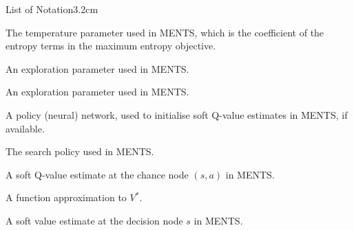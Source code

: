 \begin{mclistof}{List of Notation}{3.2cm}
    \item[{\parbox[t]{\textwidth}{
        \Large\textbf{Maximum ENtropy Tree Search (Section \ref{sec:2-4-3-ments})}\hfill\hfill
    }}]
    \item[TODO]
    \item[$\alpha_{\ments}$] 
        The temperature parameter used in MENTS, which is the coefficient of the entropy terms in the maximum entropy objective.
    \item[$\epsilon$]
        An exploration parameter used in MENTS.
    \item[$\lambda_s$] 
        An exploration parameter used in MENTS.
    \item[$\tilde{\pi}$] 
        A policy (neural) network, used to initialise soft Q-value estimates in MENTS, if available. 
    \item[$\piments$] 
        The search policy used in MENTS.
    \item[$\Qments(s,a)$] 
        A soft Q-value estimate at the chance node $(s,a)$ in MENTS.
    \item[$\tilde{V}$] 
        A function approximation to $V^*$.
    \item[$\Vments(s)$] 
        A soft value estimate at the decision node $s$ in MENTS.
\end{mclistof} 

